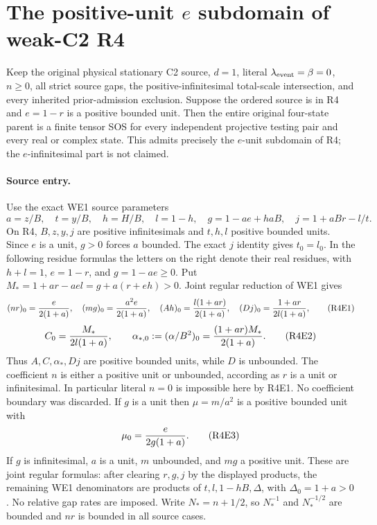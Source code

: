 \section{The positive-unit $e$ subdomain of weak-C2 R4}
\label{sec:r17-r4-eunit}

\begin{theorem}
Keep the original physical stationary C2 source, $d=1$, literal
$\lambda_{\rm event}=\beta=0$, $n\ge0$, all strict source gaps, the
positive-infinitesimal total-scale intersection, and every inherited
prior-admission exclusion. Suppose the ordered source is in R4 and
$e=1-r$ is a positive bounded unit. Then the entire original four-state
parent is a finite tensor SOS for every independent projective testing
pair and every real or complex state. This admits precisely the
$e$-unit subdomain of R4; the $e$-infinitesimal part is not claimed.
\end{theorem}

\paragraph{Source entry.}
Use the exact WE1 source parameters
\[
 a=z/B,\quad t=y/B,\quad h=H/B,\quad l=1-h,
 \quad g=1-ae+haB,\quad j=1+aBr-l/t.
\]
On R4, $B,z,y,j$ are positive infinitesimals and $t,h,l$ positive
bounded units. Since $e$ is a unit, $g>0$ forces $a$ bounded.
The exact $j$ identity gives $t_0=l_0$. In the following residue
formulas the letters on the right denote their real residues, with
$h+l=1$, $e=1-r$, and $g=1-ae\ge0$. Put
$M_*=1+ar-ael=g+a(r+eh)>0$. Joint regular reduction of WE1 gives
\[
 (nr)_0={e\over2(1+a)},\quad
 (mg)_0={a^2e\over2(1+a)},\quad
 (Ah)_0={l(1+ar)\over2(1+a)},\quad
 (Dj)_0={1+ar\over2l(1+a)},                         \tag{R4E1}
\]
\[
 C_0={M_*\over2l(1+a)},\qquad
 \alpha_{*,0}:=(\alpha/B^2)_0={(1+ar)M_*\over2(1+a)}.\tag{R4E2}
\]
Thus $A,C,\alpha_*,Dj$ are positive bounded units, while $D$ is
unbounded. The coefficient $n$ is either a positive unit or unbounded,
according as $r$ is a unit or infinitesimal. In particular literal
$n=0$ is impossible here by R4E1. No coefficient boundary was discarded.
If $g$ is a unit then $\mu=m/a^2$ is a positive bounded unit with
\[
                 \mu_0={e\over2g(1+a)}.              \tag{R4E3}
\]
If $g$ is infinitesimal, $a$ is a unit, $m$ unbounded, and $mg$ a
positive unit. These are joint regular formulas: after clearing $r,g,j$
by the displayed products, the remaining WE1 denominators are products
of $t,l,1-hB,\Delta$, with $\Delta_0=1+a>0$. No relative gap rates
are imposed. Write $N_*=n+1/2$, so $N_*^{-1}$ and $N_*^{-1/2}$ are
bounded and $nr$ is bounded in all source cases.

